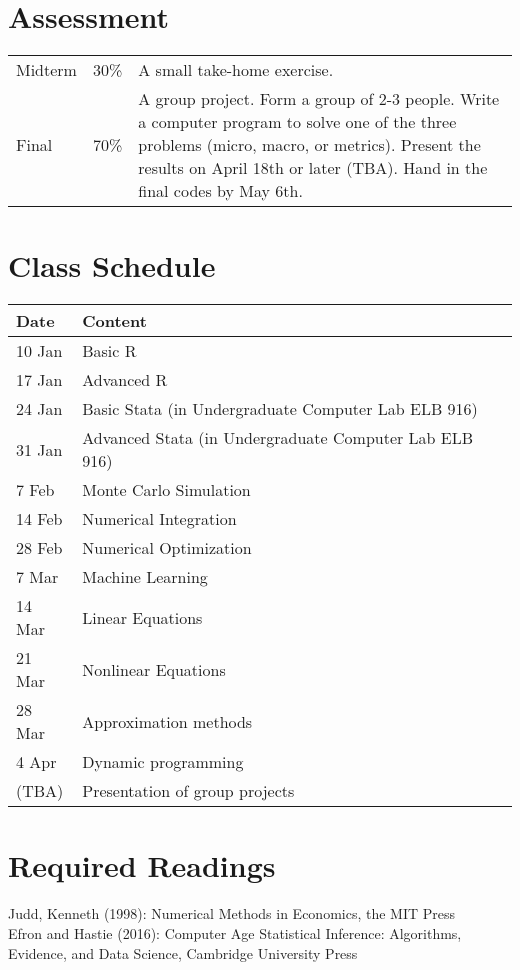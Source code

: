 \documentclass[11pt]{article}
\begin{document}
\section{Assessment}
\begin{tabular}{p{0.5in}p{0.5in}p{5in}}
   Midterm & 30\% & A small take-home exercise. \\
   Final  & 70\%  & A group project. Form a group of 2-3 people. Write a computer program to solve one of the three problems (micro, macro, or metrics). Present the results on April 18th or later (TBA). Hand in the final codes by May 6th.
\end{tabular}

\section{Class Schedule}
\begin{tabular}{p{1in}p{4in}}
  \hline
  Date & Content \\
  \hline
  10 Jan & Basic R \\
  17 Jan & Advanced R \\
  24 Jan & Basic Stata (in Undergraduate Computer Lab ELB 916) \\
  31 Jan & Advanced Stata (in Undergraduate Computer Lab ELB 916)  \\
  7 Feb &  Monte Carlo Simulation\\
  14 Feb & Numerical Integration \\
  28 Feb & Numerical Optimization  \\
  7 Mar &  Machine Learning  \\
  14 Mar & Linear Equations \\
  21 Mar & Nonlinear Equations \\
  28 Mar & Approximation methods \\
  4 Apr & Dynamic programming \\
  (TBA) & Presentation of group projects \\
  \hline
\end{tabular}





\section{Required Readings}
Judd, Kenneth (1998): Numerical Methods in Economics, the MIT Press \\
Efron and Hastie (2016): Computer Age Statistical Inference: Algorithms, Evidence, and Data Science, Cambridge University Press


% 


\end{document}

